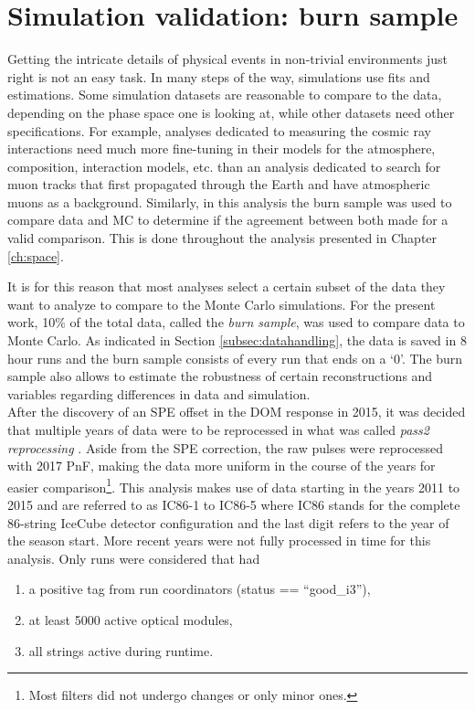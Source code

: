 \section{Simulation validation: burn sample}
\label{sec:burnsample}
Getting the intricate details of physical events in non-trivial environments just right is not an easy task. In many steps of the way, simulations use fits and estimations. Some simulation datasets are reasonable to compare to the data, depending on the phase space one is looking at, while other datasets need other specifications. For example, analyses dedicated to measuring the cosmic ray interactions need much more fine-tuning in their models for the atmosphere, composition, interaction models, etc. than an analysis dedicated to search for muon tracks that first propagated through the Earth and have atmospheric muons as a background. Similarly, in this analysis the burn sample was used to compare data and MC to determine if the agreement between both made for a valid comparison. This is done throughout the analysis presented in Chapter \ref{ch:space}.

It is for this reason that most analyses select a certain subset of the data they want to analyze to compare to the Monte Carlo simulations. For the present work, 10\% of the total data, called the \textit{burn sample}, was used to compare data to Monte Carlo. As indicated in Section \ref{subsec:datahandling}, the data is saved in 8 hour runs and the burn sample consists of every run that ends on a `0'. The burn sample also allows to estimate the robustness of certain reconstructions and variables regarding differences in data and simulation.\\

\noindent After the discovery of an SPE offset in the DOM response in 2015, it was decided that multiple years of data were to be reprocessed in what was called \textit{pass2 reprocessing} \cite{pass2}. Aside from the SPE correction, the raw pulses were reprocessed with 2017 PnF, making the data more uniform in the course of the years for easier comparison\footnote{Most filters did not undergo changes or only minor ones.}. This analysis makes use of data starting in the years 2011 to 2015 and are referred to as IC86-1 to IC86-5 where IC86 stands for the complete 86-string IceCube detector configuration and the last digit refers to the year of the season start. More recent years were not fully processed in time for this analysis. Only runs were considered that had
\vspace{2mm}
\begin{enumerate}
\item a positive tag from run coordinators (status == ``good\_i3''),
\item at least 5000 active optical modules,
\item all strings active during runtime.
\end{enumerate}
\vspace{2mm}

